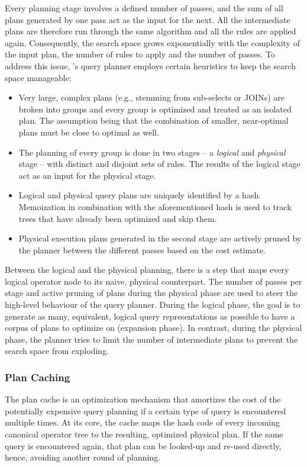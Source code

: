 Every planning stage involves a defined number of passes, and the sum of all plans generated by one pass act as the input for the next. All the intermediate plans are therefore run through the same algorithm and all the rules are applied again. Consequently, the search space grows exponentially with the complexity of the input plan, the number of rules to apply and the number of passes. To address this issue, \cottontail{}'s query planner employs certain heuristics to keep the search space manageable:

\begin{itemize}
    \item Very large, complex plans (e.g., stemming from sub-selects or JOINs) are broken into groups and every group is optimized and treated as an isolated plan. The assumption being that the combination of smaller, near-optimal plans must be close to optimal as well.
    \item The planning of every group is done in two stages -- a \emph{logical} and \emph{physical} stage -- with distinct and disjoint sets of rules. The results of the logical stage act as an input for the physical stage.
    \item Logical and physical query plans are uniquely identified by a hash. Memoization in combination with the aforementioned hash is used to track trees that have already been optimized and skip them.
    \item Physical execution plans generated in the second stage are actively pruned by the planner between the different passes based on the cost estimate.
\end{itemize}

Between the logical and the physical planning, there is a step that maps every logical operator node to its naive, physical counterpart. The number of passes per stage and active pruning of plans during the physical phase are used to steer the high-level behaviour of the query planner. During the logical phase, the goal is to generate as many, equivalent, logical query representations as possible to have a corpus of plans to optimize on (expansion phase). In contrast, during the physical phase, the planner tries to limit the number of intermediate plans to prevent the search space from exploding.

\subsubsection{Plan Caching}

The plan cache is an optimization mechanism that amortizes the cost of the potentially expensive query planning if a certain type of query is encountered multiple times. At its core, the cache maps the hash code of every incoming canonical operator tree to the resulting, optimized physical plan. If the same query is encountered again, that plan can be looked-up and re-used directly, hence, avoiding another round of planning.

